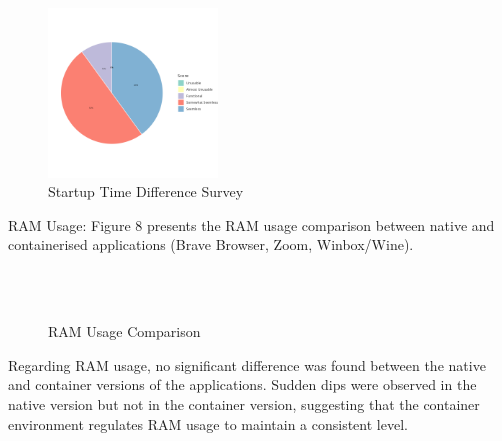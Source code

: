 \documentclass[journal,onecolumn]{IEEEtran}
\begin{document}
\begin{figure}[ht]
    \centering
    \includegraphics[width=0.4\textwidth]{pie_ui}
    \caption{Startup Time Difference Survey}
    \label{fig:pi_ui}
\end{figure}
\newpage
RAM Usage: Figure 8 presents the RAM usage comparison between native and containerised applications (Brave Browser, Zoom, Winbox/Wine).

\begin{figure}[ht!]
    \centering
    \hfill
    \\
    \hfill
    \\
    \caption{RAM Usage Comparison}
\end{figure}

Regarding RAM usage, no significant difference was found between the native and container versions of the applications. Sudden dips were observed in the native version but not in the container version, suggesting that the container environment regulates RAM usage to maintain a consistent level.
\end{document}
